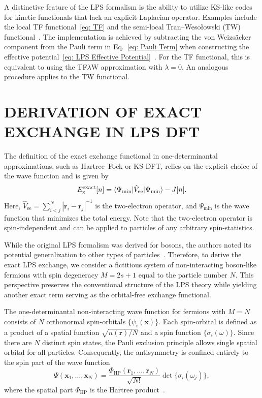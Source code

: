 \documentclass[%
 reprint,
 amsmath,amssymb,
 aps,
pra,
]{revtex4-2}
\begin{document}
A distinctive feature of the LPS formalism is the ability to utilize KS-like codes for kinetic functionals that lack an explicit Laplacian operator. Examples include the local TF functional~\eqref{eq: TF} and the semi-local Tran--Wesołowski (TW) functional~\cite{Tran.2002.IJQC.89.441}. The implementation is achieved by subtracting the von Weizsäcker component from the Pauli term in Eq.~\eqref{eq: Pauli Term} when constructing the effective potential~\eqref{eq: LPS Effective Potential}~\cite{Lehtomäki.2014.JCP.141.234102}. For the TF functional, this is equivalent to using the TF$\lambda$W approximation with $\lambda=0$. An analogous procedure applies to the TW functional.

\section{DERIVATION OF EXACT EXCHANGE IN LPS DFT}

The definition of the exact exchange functional in one-determinantal approximations, such as Hartree--Fock or KS DFT, relies on the explicit choice of the wave function and is given by
\begin{equation}\label{eq: Exact Exchange}
    E^{\text{exact}}_{\text{x}}[n]
    =
    \braket{\Psi_{\text{min}}|
    \hat{V}_{\text{ee}}
    |\Psi_{\text{min}}}
    -
    J[n].
\end{equation}
Here, $\hat{V}_{\text{ee}} = \sum^N_{i<j}|\textbf{r}_{i}-\textbf{r}_{j}|^{-1}$ is the two-electron operator, and $\Psi_{\text{min}}$ is the wave function that minimizes the total energy. Note that the two-electron operator is spin-independent and can be applied to particles of any arbitrary spin-statistics.

While the original LPS formalism was derived for bosons, the authors noted its potential generalization to other types of particles~\cite{Levy.1984.PRA.30.2745}. Therefore, to derive the exact LPS exchange, we consider a fictitious system of non-interacting boson-like fermions with spin degeneracy $M=2s+1$ equal to the particle number $N$. This perspective preserves the conventional structure of the LPS theory while yielding another exact term serving as the orbital-free exchange functional. 

The one-determinantal non-interacting wave function for fermions with $M=N$ consists of $N$ orthonormal spin-orbitals $\{\psi_i(\textbf{x})\}$. Each spin-orbital is defined as a product of a spatial function $\sqrt{n(\textbf{r})/N}$ and a spin function $\{\sigma_i(\omega)\}$. Since there are $N$ distinct spin states, the Pauli exclusion principle allows single spatial orbital for all particles. Consequently, the antisymmetry is confined entirely to the spin part of the wave function
\begin{equation}\label{eq: Boson-Like WF}
    \Psi(\textbf{x}_1, \dots,\textbf{x}_N)
    =
    \frac{\Phi_{\text{HP}}(\textbf{r}_1,\dots,\textbf{r}_N)}{\sqrt{N!}}
    \det\{\sigma_i(\omega_j)\},
\end{equation}
where the spatial part $\Phi_{\text{HP}}$ is the Hartree product~\cite{Szabo.2012.modern}. 
\end{document}
